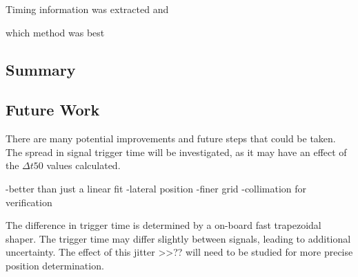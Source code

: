 Timing information was extracted and 

which method was best

\subsection{Summary}


\subsection{Future Work}

There are many potential improvements and future steps that could be taken. The spread in signal trigger time will be investigated, as it may have an effect of the $\Delta t50$ values calculated. 

-better than just a linear fit
-lateral position
-finer grid
-collimation for verification

The difference in trigger time is determined by a on-board fast trapezoidal shaper. The trigger time may differ slightly between signals, leading to additional uncertainty. The effect of this jitter >>?? will need to be studied for more precise position determination.